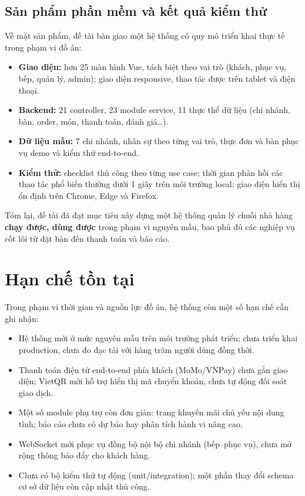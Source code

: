 \documentclass[../DoAn.tex]{subfiles}
\begin{document}
\subsection{Sản phẩm phần mềm và kết quả kiểm thử}

Về mặt sản phẩm, đề tài bàn giao một hệ thống có quy mô triển khai thực tế trong phạm vi đồ án:

\begin{itemize}
    \item \textbf{Giao diện:} hơn 25 màn hình Vue, tách biệt theo vai trò (khách, phục vụ, bếp, quản lý, admin); giao diện responsive, thao tác được trên tablet và điện thoại.
    \item \textbf{Backend:} 21 controller, 23 module service, 11 thực thể dữ liệu (chi nhánh, bàn, order, món, thanh toán, đánh giá\ldots).
    \item \textbf{Dữ liệu mẫu:} 7 chi nhánh, nhân sự theo từng vai trò, thực đơn và bàn phục vụ demo và kiểm thử end-to-end.
    \item \textbf{Kiểm thử:} checklist thủ công theo từng use case; thời gian phản hồi các thao tác phổ biến thường dưới 1 giây trên môi trường local; giao diện hiển thị ổn định trên Chrome, Edge và Firefox.
\end{itemize}

Tóm lại, đề tài đã đạt mục tiêu xây dựng một hệ thống quản lý chuỗi nhà hàng \textbf{chạy được, dùng được} trong phạm vi nguyên mẫu, bao phủ đủ các nghiệp vụ cốt lõi từ đặt bàn đến thanh toán và báo cáo.

\section{Hạn chế tồn tại}
\label{section:5.2}

Trong phạm vi thời gian và nguồn lực đồ án, hệ thống còn một số hạn chế cần ghi nhận:

\begin{itemize}
    \item Hệ thống mới ở mức nguyên mẫu trên môi trường phát triển; chưa triển khai production, chưa đo đạc tải với hàng trăm người dùng đồng thời.
    \item Thanh toán điện tử end-to-end phía khách (MoMo/VNPay) chưa gắn giao diện; VietQR mới hỗ trợ hiển thị mã chuyển khoản, chưa tự động đối soát giao dịch.
    \item Một số module phụ trợ còn đơn giản: trang khuyến mãi chủ yếu nội dung tĩnh; báo cáo chưa có dự báo hay phân tích hành vi nâng cao.
    \item WebSocket mới phục vụ đồng bộ nội bộ chi nhánh (bếp--phục vụ), chưa mở rộng thông báo đẩy cho khách hàng.
    \item Chưa có bộ kiểm thử tự động (unit/integration); một phần thay đổi schema cơ sở dữ liệu còn cập nhật thủ công.
\end{itemize}
\end{document}
